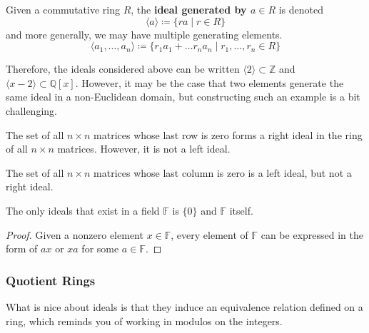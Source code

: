   \begin{definition}
    Given a commutative ring $R$, the \textbf{ideal generated by $a \in R$} is denoted 
    \begin{equation}
      \langle a \rangle \coloneqq \{r a \mid r \in R\}
    \end{equation}
    and more generally, we may have multiple generating elements. 
    \begin{equation}
      \langle a_1, \ldots, a_n \rangle \coloneqq \{ r_1 a_1 + \ldots r_n a_n \mid r_1, \ldots, r_n \in R \}
    \end{equation}
  \end{definition}

  Therefore, the ideals considered above can be written $\langle 2 \rangle \subset \mathbb{Z}$ and $\langle x - 2 \rangle \subset \mathbb{Q}[x]$. However, it may be the case that two elements generate the same ideal in a non-Euclidean domain, but constructing such an example is a bit challenging.   

  \begin{example}
    The set of all $n \times n$ matrices whose last row is zero forms a right ideal in the ring of all $n \times n$ matrices. However, it is not a left ideal.

    The set of all $n\times n$ matrices whose last column is zero is a left ideal, but not a right ideal. 
  \end{example}

  \begin{theorem}
    The only ideals that exist in a field $\mathbb{F}$ is $\{0\}$ and $\mathbb{F}$ itself. 
  \end{theorem}
  \begin{proof}
    Given a nonzero element $x \in \mathbb{F}$, every element of $\mathbb{F}$ can be expressed in the form of $a x$ or $x a$ for some $a \in \mathbb{F}$. 
  \end{proof}

\subsubsection{Quotient Rings}

  What is nice about ideals is that they induce an equivalence relation defined on a ring, which reminds you of working in modulos on the integers. 

